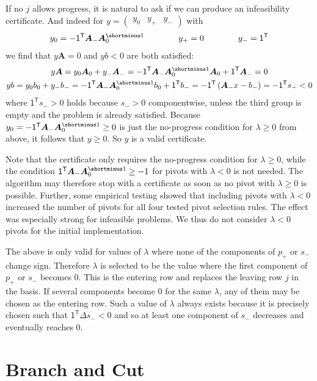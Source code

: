 \documentclass[a4paper, 12pt]{article}
\newcommand{\minv} { {\shortminus1} }
\newcommand{\mtrp} {\mathsf{T}}
\newcommand{\one} {\mathsf{1}}
\begin{document}
If no $j$ allows progress, it is natural to ask if we can produce an infeasibility certificate. And indeed for $y = \begin{pmatrix} y_0 & y_+ & y_- \end{pmatrix}$ with
\begin{equation*}
y_0 = -\one^\mtrp \bm{A}_- \bm{A}_0^\minv \qquad\qquad y_+ = 0 \qquad\qquad y_- = \one^\mtrp
\end{equation*}
we find that $y \bm{A} = 0$ and $y b < 0$ are both satisfied:
\begin{gather*}
y \bm{A} = y_0 \bm{A}_0 + y_- \bm{A}_- = -\one^\mtrp \bm{A}_- \bm{A}_0^\minv \bm{A}_0 + \one^\mtrp \bm{A}_- = 0
\\
y b = y_0 b_0 + y_- b_- = -\one^\mtrp \bm{A}_- \bm{A}_0^\minv b_0 + \one^\mtrp b_- = -\one^\mtrp \left(\bm{A}_- x - b_-\right) = -\one^\mtrp s_- < 0
\end{gather*}
where $\one^\mtrp s_- > 0$ holds because $s_- > 0$ componentwise, unless the third group is empty and the problem is already satisfied.
Because $y_0 = -\one^\mtrp \bm{A}_- \bm{A}_0^\minv \geq 0$ is just the no-progress condition for $\lambda \geq 0$ from above, it follows that $y \geq 0$. So $y$ is a valid certificate.

Note that the certificate only requires the no-progress condition for $\lambda \geq 0$, while the condition $\one^\mtrp \bm{A}_- \bm{A}_0^\minv \geq -1$ for pivots with $\lambda < 0$ is not needed. The algorithm may therefore stop with a certificate as soon as no pivot with $\lambda \geq 0$ is possible. Further, some empirical testing showed that including pivots with $\lambda < 0$ increased the number of pivots for all four tested pivot selection rules. The effect was especially strong for infeasible problems. We thus do not consider $\lambda < 0$ pivots for the initial implementation.

The above is only valid for values of $\lambda$ where none of the components of $p_+$ or $s_-$ change sign. Therefore $\lambda$ is selected to be the value where the first component of $p_+$ or $s_-$ becomes 0. This is the entering row and replaces the leaving row $j$ in the basis. If several components become 0 for the same $\lambda$, any of them may be chosen as the entering row. Such a value of $\lambda$ always exists because it is precisely chosen such that $\one^\mtrp \Delta s_- < 0$ and so at least one component of $s_-$ decreases and eventually reaches 0.

\section{Branch and Cut}\label{sec:branch-and-cut}
\end{document}
